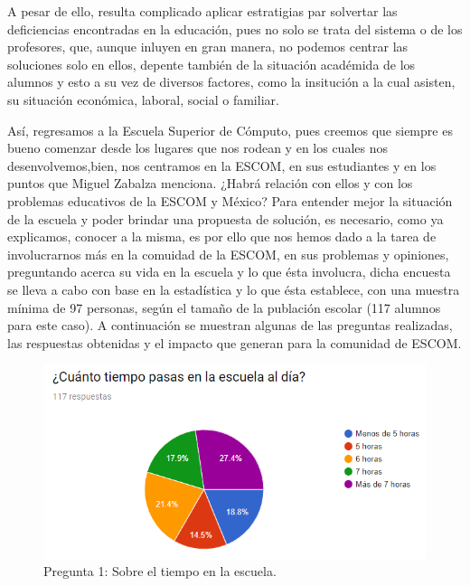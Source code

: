 \noindent
\newline
A pesar de ello, resulta complicado aplicar estratigias par solvertar las deficiencias encontradas en la
educación, pues no solo se trata del sistema o de los profesores, que, aunque inluyen en gran manera, no
podemos centrar las soluciones solo en ellos, depente también de la situación académida de los alumnos
y esto a su vez de diversos factores, como la insitución a la cual asisten, su situación económica, laboral,
social o familiar. 

\noindent
Así, regresamos a la Escuela Superior de Cómputo, pues creemos que siempre es bueno comenzar desde los 
lugares que nos rodean y en los cuales nos desenvolvemos,bien, nos centramos en la ESCOM, en sus 
estudiantes y en los puntos que Miguel Zabalza menciona. ¿Habrá relación con ellos y con los problemas 
educativos de la ESCOM y México? Para entender mejor la situación de la escuela y poder brindar una propuesta 
de solución, es necesario, como ya explicamos, conocer a la misma, es por ello que nos hemos dado a la tarea 
de involucrarnos más en la comuidad de la ESCOM, en sus problemas y opiniones, preguntando
acerca su vida en la escuela y lo que ésta involucra, dicha encuesta se lleva a cabo con base en la
estadística y lo que ésta establece, con una muestra mínima de 97 personas, según el tamaño de la publación
escolar (117 alumnos para este caso). 
A continuación se muestran algunas de las preguntas realizadas, las respuestas obtenidas y el impacto que
generan para la comunidad de ESCOM. 

\pagebreak
\begin{figure}[htbp!]
	\centering
	\includegraphics[width=1\textwidth]{intro/images_justificacion/encuesta_horasEnESCOM}
	\caption{Pregunta 1: Sobre el tiempo en la escuela.}
\end{figure}

